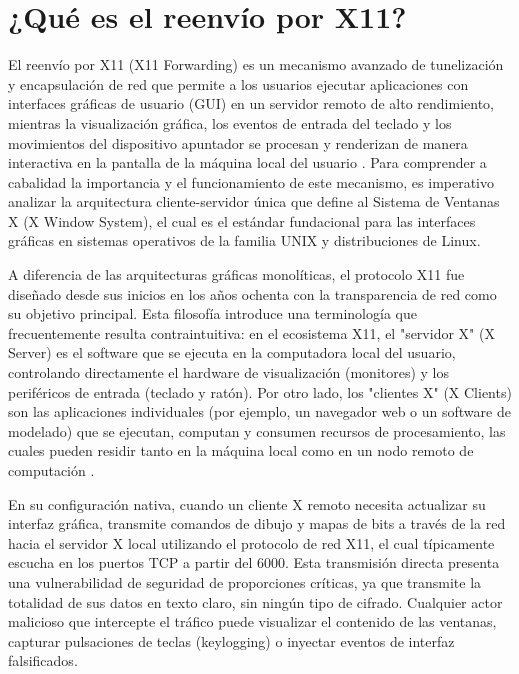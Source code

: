 \documentclass[a4paper,12pt]{article}
\begin{document}
\renewcommand{\footrulewidth}{0.4pt}  %

\setcounter{page}{1}

\tableofcontents


\newpage

\section{¿Qué es el reenvío por X11?}

El reenvío por X11 (X11 Forwarding) es un mecanismo avanzado de tunelización y encapsulación de red que permite a los usuarios ejecutar aplicaciones con interfaces gráficas de usuario (GUI) en un servidor remoto de alto rendimiento, mientras la visualización gráfica, los eventos de entrada del teclado y los movimientos del dispositivo apuntador se procesan y renderizan de manera interactiva en la pantalla de la máquina local del usuario \cite{ibm_x11}. Para comprender a cabalidad la importancia y el funcionamiento de este mecanismo, es imperativo analizar la arquitectura cliente-servidor única que define al Sistema de Ventanas X (X Window System), el cual es el estándar fundacional para las interfaces gráficas en sistemas operativos de la familia UNIX y distribuciones de Linux.

A diferencia de las arquitecturas gráficas monolíticas, el protocolo X11 fue diseñado desde sus inicios en los años ochenta con la transparencia de red como su objetivo principal. Esta filosofía introduce una terminología que frecuentemente resulta contraintuitiva: en el ecosistema X11, el "servidor X" (X Server) es el software que se ejecuta en la computadora local del usuario, controlando directamente el hardware de visualización (monitores) y los periféricos de entrada (teclado y ratón). Por otro lado, los "clientes X" (X Clients) son las aplicaciones individuales (por ejemplo, un navegador web o un software de modelado) que se ejecutan, computan y consumen recursos de procesamiento, las cuales pueden residir tanto en la máquina local como en un nodo remoto de computación \cite{ibm_x11}.

En su configuración nativa, cuando un cliente X remoto necesita actualizar su interfaz gráfica, transmite comandos de dibujo y mapas de bits a través de la red hacia el servidor X local utilizando el protocolo de red X11, el cual típicamente escucha en los puertos TCP a partir del 6000. Esta transmisión directa presenta una vulnerabilidad de seguridad de proporciones críticas, ya que transmite la totalidad de sus datos en texto claro, sin ningún tipo de cifrado. Cualquier actor malicioso que intercepte el tráfico puede visualizar el contenido de las ventanas, capturar pulsaciones de teclas (keylogging) o inyectar eventos de interfaz falsificados.
\end{document}
